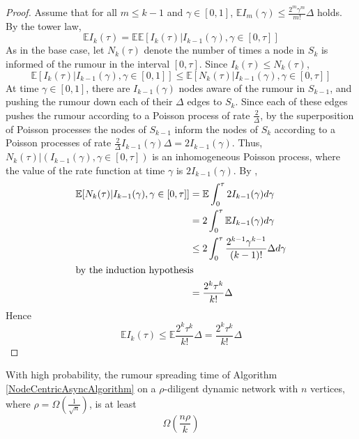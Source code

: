 \begin{proof}
	Assume that for all $m \leq k - 1$ and $\gamma \in [0,1]$, $\mathbb{E}I_m(\gamma) \leq \frac{2^m \gamma^m}{m!}\Delta$ holds.
	By the tower law,
	$$
		\mathbb{E}I_k(\tau) = \mathbb{E}\mathbb{E}[I_k(\tau) |I_{k-1}(\gamma), \gamma \in [0, \tau]] %
	$$
	As in the base case, let $N_k(\tau)$ denote the number of times a node in $S_k$ is informed of the rumour in the interval $[0, \tau]$. Since $I_k(\tau) \leq N_k(\tau)$,
	$$
		\mathbb{E}[I_k(\tau) |I_{k-1}(\gamma), \gamma \in [0, 1]] \leq \mathbb{E}[N_k(\tau) |I_{k-1}(\gamma), \gamma \in [0, \tau]]
	$$
	At time $\gamma \in [0,1]$, there are $I_{k-1}(\gamma)$ nodes aware of the rumour in $S_{k-1}$, and pushing the rumour down each of their $\Delta$ edges to $S_k$. Since each of these edges pushes the rumour according to a Poisson process of rate $\frac{2}{\Delta}$, by the superposition of Poisson processes the nodes of $S_{k-1}$ inform the nodes of $S_k$ according to a Poisson processes of rate $\frac{2}{\Delta}I_{k-1}(\gamma)\Delta = 2 I_{k-1}(\gamma)$.
	Thus, $N_k(\tau)|(I_{k-1}(\gamma), \gamma \in [0, \tau])$ is an inhomogeneous Poisson process, where the value of the rate function at time $\gamma$ is $2 I_{k-1}(\gamma)$. By %
	, 
	\begin{align*}
		\mathbb{E}[N_k(\tau)|I_{k-1}(\gamma), \gamma \in [0, \tau]] &= \mathbb{E}\int_0^\tau 2 I_{k-1}(\gamma) d\gamma \\
		&= 2 \int_0^\tau \mathbb{E}I_{k-1}(\gamma) d\gamma \\ %
		& \leq 2 \int_0^\tau \frac{2^{k-1} \gamma^{k-1}}{(k-1)!} \Delta d\gamma \\
		\intertext{by the induction hypothesis}
		& = \frac{2^k \tau^k}{k!} \Delta
	\end{align*}
	Hence 
	$$
		\mathbb{E}I_k(\tau) \leq \mathbb{E}\frac{2^k \tau^k}{k!}\Delta = \frac{2^k \tau^k}{k!}\Delta
	$$

\end{proof}


\begin{theorem}
	With high probability, the rumour spreading time of Algorithm \ref{NodeCentricAsyncAlgorithm} on a $\rho$-diligent dynamic network with $n$ vertices, where $\rho = \Omega(\frac{1}{\sqrt{n}})$, is at least 
	$$
		\Omega\left(\frac{n \rho}{k}\right)
	$$
\end{theorem}

